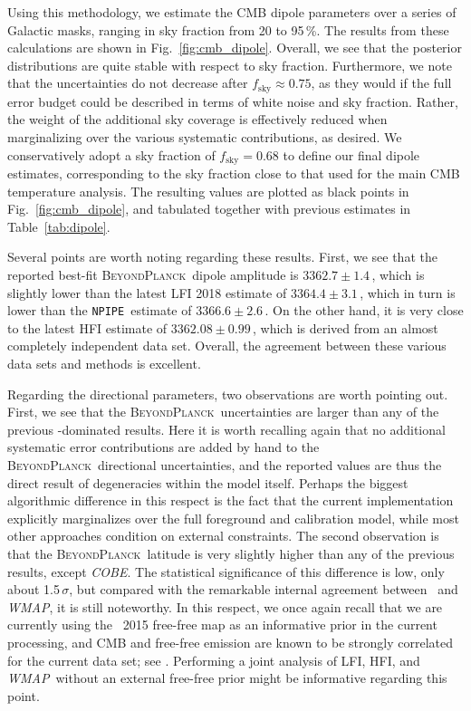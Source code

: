 \documentclass[twocolumn]{aa}
\def\WMAP{\textit{WMAP}}
\def\COBE{\textit{COBE}}
\newcommand{\BP}{\textsc{BeyondPlanck}}
\newcommand{\npipe}[0]{\texttt{NPIPE}}
\begin{document}
Using this methodology, we estimate the CMB dipole parameters over a
series of Galactic masks, ranging in sky fraction from 20 to
95\,\%. The results from these calculations are shown in
Fig.~\ref{fig:cmb_dipole}. Overall, we see that the posterior
distributions are quite stable with respect to sky
fraction. Furthermore, we note that the uncertainties do not decrease
after $f_{\mathrm{sky}}\approx 0.75$, as they would if the full error
budget could be described in terms of white noise and sky
fraction. Rather, the weight of the additional sky coverage is
effectively reduced when marginalizing over the various systematic
contributions, as desired. We conservatively adopt a sky fraction of
$f_{\mathrm{sky}}=0.68$ to define our final dipole estimates,
corresponding to the sky fraction close to that used for the main CMB
temperature analysis. The resulting values are plotted as black points
in Fig.~\ref{fig:cmb_dipole}, and tabulated together with previous
estimates in Table~\ref{tab:dipole}.

Several points are worth noting regarding these results. First, we see
that the reported best-fit \BP\ dipole amplitude is
${3362.7\pm1.4}$\,\muK, which is slightly lower than the latest LFI
2018 estimate of ${3364.4\pm3.1}$\,\muK, which in turn is lower than
the \npipe\ estimate of ${3366.6\pm2.6}$\,\muK. On the other hand, it
is very close to the latest HFI estimate of
${3362.08\pm0.99}$\,\muK, which is derived from an almost completely
independent data set. Overall, the agreement between these various
data sets and methods is excellent.

Regarding the directional parameters, two observations are worth
pointing out. First, we see that the \BP\ uncertainties are larger
than any of the previous \Planck-dominated results. Here it is worth
recalling again that no additional systematic error contributions are
added by hand to the \BP\ directional uncertainties, and the reported
values are thus the direct result of degeneracies within the model
itself. Perhaps the biggest algorithmic difference in this respect is
the fact that the current implementation explicitly marginalizes over the
full foreground and calibration model, while most other approaches
condition on external constraints. The second observation is that the
\BP\ latitude is very slightly higher than any of the previous
results, except \COBE. The statistical significance of this difference
is low, only about 1.5\,$\sigma$, but compared with the remarkable
internal agreement between \Planck\ and \WMAP, it is still
noteworthy. In this respect, we once again recall that we are
currently using the \Planck\ 2015 free-free map as an informative
prior in the current processing, and CMB and free-free emission are
known to be strongly correlated for the current data set; see
\citet{bp13}. Performing a joint analysis of LFI, HFI, and
\WMAP\ without an external free-free prior might be informative
regarding this point.
\end{document}
